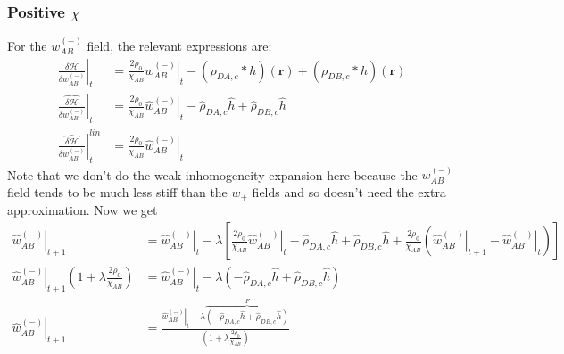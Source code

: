 \documentclass{article}
\begin{document}
    \subsubsection{Positive $\chi$}
  For the $w_{AB}^{(-)}$ field, the relevant expressions are:
  \begin{align*}
  \left. \frac{\delta \mathcal{H}}{\delta w_{AB}^{(-)}} \right|_t &=
  \frac{2 \rho_0}{\chi_{AB}} \left. w_{AB}^{(-)} \right|_t
  - (\rho_{DA,c} \ast h)(\mathbf{r})
  + (\rho_{DB,c} \ast h)(\mathbf{r}) \\
  \left. \hat{\frac{\delta \mathcal{H}}{\delta w_{AB}^{(-)}}} \right|_t &=
  \frac{2 \rho_0}{\chi_{AB}} \left. \hat{w}_{AB}^{(-)} \right|_t
  - \hat{\rho}_{DA,c} \hat{h}
  + \hat{\rho}_{DB,c} \hat{h} \\
  \left.
  \hat{\frac{\delta \mathcal{H}}{\delta w_{AB}^{(-)}}}
  \right| ^{lin}_t &=
  \frac{2\rho_0}{\chi_{AB}} \left. \hat{w}_{AB}^{(-)} \right|_t
  \end{align*}
  Note that we don't do the weak inhomogeneity expansion here because the
  $w_{AB}^{(-)}$ field tends to be much less stiff than the $w_+$ fields and so
  doesn't need the extra approximation.
  Now we get
  \begin{align*}
  \left. \hat{w}_{AB}^{(-)} \right|_{t+1} &=
  \left. \hat{w}_{AB}^{(-)} \right|_t - \lambda \left[
  \frac{2\rho_0}{\chi_{AB}} \left. \hat{w}_{AB}^{(-)} \right|_t
  - \hat{\rho}_{DA,c} \hat{h}
  + \hat{\rho}_{DB,c} \hat{h}
  + \frac{2\rho_0}{\chi_{AB}}
  ( \left. \hat{w}_{AB}^{(-)}\right|_{t+1}
  - \left. \hat{w}_{AB}^{(-)} \right|_t
  )
  \right] \\
  \left. \hat{w}_{AB}^{(-)} \right|_{t+1} ( 1 + \lambda \frac{2
  	\rho_0}{\chi_{AB}} ) &=
  \left. \hat{w}_{AB}^{(-)} \right|_t - \lambda \left(
  - \hat{\rho}_{DA,c} \hat{h}
  + \hat{\rho}_{DB,c} \hat{h}
  \right) \\
  \left. \hat{w}_{AB}^{(-)} \right|_{t+1} &=
  \frac{
    \left. \hat{w}_{AB}^{(-)} \right|_t - \lambda 
    \overbrace{
      \left(
    - \hat{\rho}_{DA,c} \hat{h}
    + \hat{\rho}_{DB,c} \hat{h}
    \right)
    }
    ^{F}
  }
  {
  	\left( 1 + \lambda \frac{2 \rho_0}{\chi_{AB}} \right)
  }
  \end{align*}
  
\end{document}
